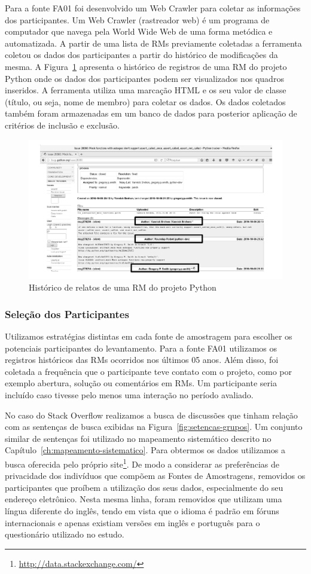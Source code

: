 Para a fonte FA01 foi desenvolvido um Web Crawler para coletar as informações
dos participantes. Um Web Crawler (rastreador web) é um programa de computador
que navega pela World Wide Web de uma forma metódica e automatizada. A partir
de uma lista de RMs previamente coletadas a ferramenta coletou os dados dos
participantes a partir do histórico de modificações da mesma. A
Figura~\ref{fig:historico-rm-python} apresenta o histórico de registros de uma
RM do projeto Python onde os dados dos participantes podem ser visualizados nos
quadros inseridos. A ferramenta utiliza uma marcação HTML e os seu valor de
classe (título, ou seja, nome de membro) para coletar os dados. Os dados
coletados também foram armazenadas em um banco de dados para posterior aplicação
de critérios de inclusão e exclusão.

\begin{figure}[htpb]
	\centering
	\includegraphics[width=0.6\linewidth]{./chapter-pesquisa-com-profissionais/img/historico-rm-python.pdf}
	\caption{Histórico de relatos de uma RM do projeto Python}
\label{fig:historico-rm-python}
\end{figure}

\subsubsection{Seleção dos Participantes}
\label{subsubsec:pesquisa_profissionais_plano_pesquisa}

Utilizamos estratégias distintas em cada fonte de amostragem para escolher os
potenciais participantes do levantamento. Para a fonte FA01 utilizamos os
registros históricos das RMs ocorridos nos últimos 05 anos. Além disso, foi
coletada a frequência que o participante teve contato com o projeto, como por
exemplo abertura, solução ou comentários em RMs. Um participante seria incluído
caso tivesse pelo menos uma interação no período avaliado.

No caso do Stack Overflow realizamos a busca de discussões que tinham relação
com as sentenças de busca exibidas na Figura~\ref{fig:setencas-grupos}. Um
conjunto similar de sentenças foi utilizado no mapeamento sistemático descrito
no Capítulo~\ref{ch:mapeamento-sistematico}. Para obtermos os dados utilizamos a
busca oferecida pelo próprio
site\footnote{\url{http://data.stackexchange.com/}}. De modo a considerar as
preferências de privacidade dos indivíduos que compõem as Fontes de Amostragens,
removidos os participantes que proíbem a utilização dos seus dados,
especialmente do seu endereço eletrônico. Nesta mesma linha, foram removidos que
utilizam uma língua diferente do inglês, tendo em vista que o idioma é padrão em
fóruns internacionais e apenas existiam versões em inglês e português para o
questionário utilizado no estudo.


